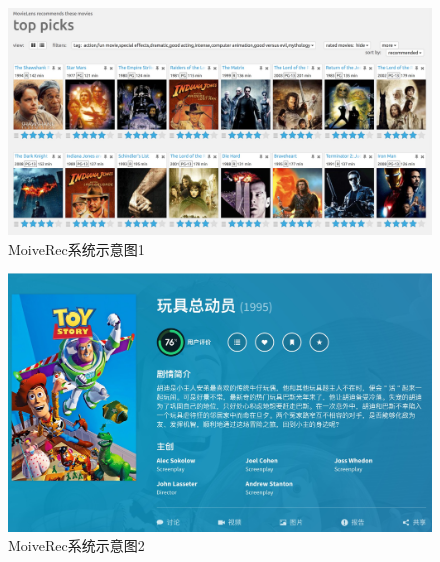 \begin{figure}[htbp]
\centering
\includegraphics[scale=0.17]{images/systemshow1.jpeg}
\caption{MoiveRec系统示意图1}
\label{fig:systemshow1}
\end{figure}

\begin{figure}[htbp]
\centering
\includegraphics[scale=0.2]{images/systemshow2.jpeg}
\caption{MoiveRec系统示意图2}
\label{fig:systemshow2}
\end{figure}


